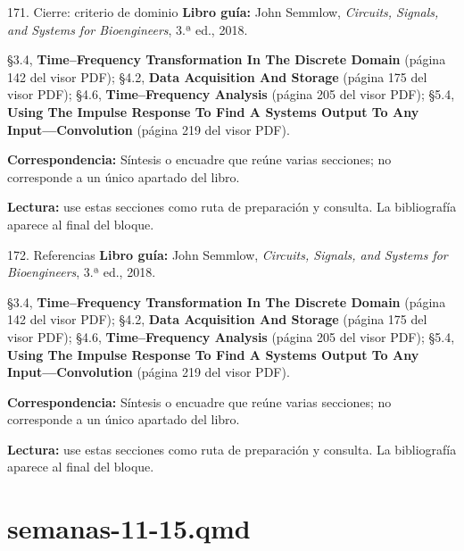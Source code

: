 \documentclass[
  10pt,
  ignorenonframetext,
  aspectratio=169,
  spanish,
]{beamer}
\begin{document}
\begin{frame}{171. Cierre: criterio de dominio}
\label{cierre-criterio-de-dominio-1}
\textbf{Libro guía:} John Semmlow, \emph{Circuits, Signals, and Systems
for Bioengineers}, 3.ª ed., 2018.

§3.4, \textbf{Time--Frequency Transformation In The Discrete Domain}
(página 142 del visor PDF); §4.2, \textbf{Data Acquisition And Storage}
(página 175 del visor PDF); §4.6, \textbf{Time--Frequency Analysis}
(página 205 del visor PDF); §5.4, \textbf{Using The Impulse Response To
Find A Systems Output To Any Input---Convolution} (página 219 del visor
PDF).

\textbf{Correspondencia:} Síntesis o encuadre que reúne varias
secciones; no corresponde a un único apartado del libro.

\textbf{Lectura:} use estas secciones como ruta de preparación y
consulta. La bibliografía aparece al final del bloque.
\end{frame}

\begin{frame}{172. Referencias}
\label{referencias-1}
\textbf{Libro guía:} John Semmlow, \emph{Circuits, Signals, and Systems
for Bioengineers}, 3.ª ed., 2018.

§3.4, \textbf{Time--Frequency Transformation In The Discrete Domain}
(página 142 del visor PDF); §4.2, \textbf{Data Acquisition And Storage}
(página 175 del visor PDF); §4.6, \textbf{Time--Frequency Analysis}
(página 205 del visor PDF); §5.4, \textbf{Using The Impulse Response To
Find A Systems Output To Any Input---Convolution} (página 219 del visor
PDF).

\textbf{Correspondencia:} Síntesis o encuadre que reúne varias
secciones; no corresponde a un único apartado del libro.

\textbf{Lectura:} use estas secciones como ruta de preparación y
consulta. La bibliografía aparece al final del bloque.
\end{frame}

\section{semanas-11-15.qmd}\label{semanas-11-15.qmd}
\end{document}
